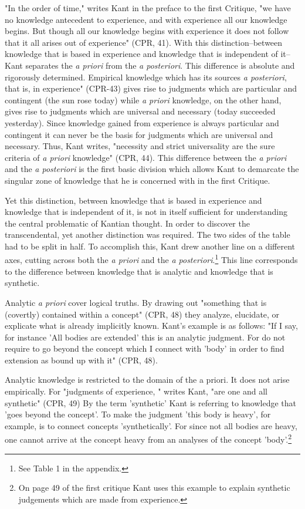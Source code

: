 "In the order of time," writes Kant in the preface to the first Critique, "we have no knowledge antecedent to experience, and with experience all our knowledge begins. But though all our knowledge begins with experience it does not follow that it all arises out of experience" (CPR, 41). With this distinction--between knowledge that is based in experience and knowledge that is independent of it--Kant separates the \textit{a priori} from the \textit{a posteriori}. This difference is absolute and rigorously determined. Empirical knowledge which has its sources \textit{a posteriori}, that is, in experience" (CPR-43) gives rise to judgments which are particular and contingent (the sun rose today) while \textit{a priori} knowledge, on the other hand, gives rise to judgments which are universal and necessary (today succeeded yesterday). Since knowledge gained from experience is always particular and contingent it can never be the basis for judgments which are universal and necessary. Thus, Kant writes, "necessity and strict universality are the sure criteria of \textit{a priori} knowledge" (CPR, 44). This difference between the \textit{a priori} and the \textit{a posteriori} is the first basic division which allows Kant to demarcate the singular zone of knowledge that he is concerned with in the first Critique.

Yet this distinction, between knowledge that is based in experience and knowledge that is independent of it, is not in itself sufficient for understanding the central problematic of Kantian thought. In order to discover the transcendental, yet another distinction was required. The two sides of the table had to be split in half. To accomplish this, Kant drew another line on a different axes, cutting across both the \textit{a priori} and the \textit{a posteriori}.\footnote{See Table 1 in the appendix.} This line corresponds to the difference between knowledge that is analytic and knowledge that is synthetic. 

Analytic \textit{a priori} cover logical truths. By drawing out "something that is (covertly) contained within a concept" (CPR, 48) they analyze, elucidate, or explicate what is already implicitly known. Kant's example is as follows: "If I say, for instance 'All bodies are extended' this is an analytic judgment. For do not require to go beyond the concept which I connect with 'body' in order to find extension as bound up with it" (CPR, 48).

Analytic knowledge is restricted to the domain of the a priori. It does not arise empirically. For "judgments of experience, " writes Kant, "are one and all synthetic" (CPR, 49) By the term 'synthetic' Kant is referring to knowledge that 'goes beyond the concept'. To make the judgment 'this body is heavy', for example, is to connect concepts 'synthetically'. For since not all bodies are heavy, one cannot arrive at the concept heavy from an analyses of the concept 'body'.\footnote{On page 49 of the first critique Kant uses this example to explain synthetic judgements which are made from experience.}


